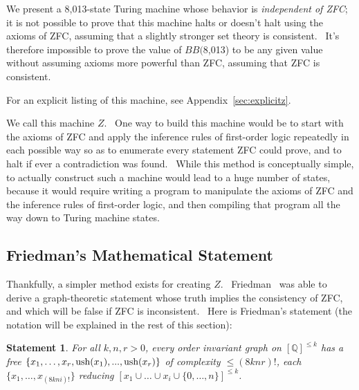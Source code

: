 \documentclass[11pt]{article}
\newtheorem{statement}{Statement}
\newcommand{\statenumstate}{8,013-state }
\newcommand{\bbstatenum}{$BB($8,013) }
\begin{document}
We present a \statenumstate Turing machine whose behavior is \emph{independent of ZFC}; it is not possible to prove that this machine halts or doesn't halt using the axioms of ZFC, assuming that a slightly stronger set theory is consistent. \ It's therefore impossible to prove the value of \bbstatenum to be any given value without assuming axioms more powerful than ZFC, assuming that ZFC is consistent.

For an explicit listing of this machine, see Appendix~\ref{sec:explicitz}.

We call this machine $Z$. \ One way to build this machine would be to start with the axioms of ZFC and apply the inference rules of first-order logic repeatedly in each possible way so as to enumerate every statement ZFC could prove, and to halt if ever a contradiction was found. \ While this method is conceptually simple, to actually construct such a machine would lead to a huge number of states, because it would require writing a program to manipulate the axioms of ZFC and the inference rules of first-order logic, and then compiling that program all the way down to Turing machine states.

\subsection{Friedman's Mathematical Statement} \label{sec:friedmanstate}

Thankfully, a simpler method exists for creating $Z$. \ Friedman~\cite{friedman}
was able to derive a graph-theoretic statement whose truth implies the consistency of ZFC, and which will be false if ZFC is inconsistent.\footnotemark
{} \
Here is Friedman's statement (the notation will be explained in the rest of this section):

\begin{statement} \label{eq:friedman}
For all $k, n, r > 0$, every order invariant graph on $[\mathbb{Q}]^{\le k}$ has a free $\{x_1,\dots,x_r, \\
\textrm{ush}(x_1),...,\textrm{ush}(x_r)\}$ of complexity $\le (8knr)!$, each $\{x_1, \dots, x_{(8kni)!}\}$
reducing $[x_1 \cup \dots \cup x_i \cup \{0,\dots,n\}]^{\le k}$. \cite{friedman}
\end{statement}
\end{document}
